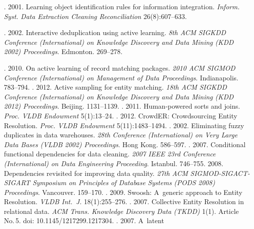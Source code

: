\begin{multicols}{2}
{{\begin{thebibliography}{99}
. 2001.
Learning object identification rules for information integration.
\textit{Inform. Syst. Data Extraction Cleaning Reconciliation} 26(8):607--633.

. 2002.
Interactive deduplication using active learning.
\textit{8th ACM SIGKDD  Conference (International) on Knowledge Discovery and
Data Mining (KDD 2002) Proceedings}. Edmonton. 269--278.

. 2010.
On active learning of record matching packages.
\textit{2010 ACM \mbox{SIGMOD}  Conference (International)
on Management of Data Proceedings}.  Indianapolis. 783--794.
. 2012.
Active sampling for entity matching. \textit{18th ACM SIGKDD
Conference (International) on Knowledge Discovery and Data Mining (KDD 2012) Proceedings}. Beijing. 1131--1139.
.
2011. Human-powered sorts and joins. \textit{Proc. VLDB Endowment} 5(1):13--24.
. 2012.
CrowdER: Crowdsourcing Entity Resolution.
\textit{Proc. VLDB Endowment} 5(11):1483--1494.
. 2002.
Eliminating fuzzy duplicates in data warehouses. \textit{28th Conference (International) on
Very Large Data Bases (VLDB 2002)
Proceedings}. Hong Kong. 586--597.
. 2007.
Conditional functional dependencies for data cleaning. \textit{2007 IEEE
23rd  Conference (International) on Data Engineering Proceeding}. Istanbul. 746--755.
 2008. Dependencies revisited for improving data quality.
\textit{27th ACM SIGMOD-SIGACT-SIGART Symposium on Principles of Database Systems
(PODS 2008) Proceedings}.  Vancouver.  159--170.
. 2009. Swoosh: A~generic approach to Entity Resolution.
\textit{VLDB Int.~J.} 18(1):255--276.
. 2007.
Collective Entity Resolution in relational data.
\textit{ACM Trans. Knowledge Discovery Data (TKDD)} 1(1). Article No.\,5.
doi: 10.1145/1217299.1217304.
. 2007. A~latent

\end{thebibliography}}}
\end{multicols}
